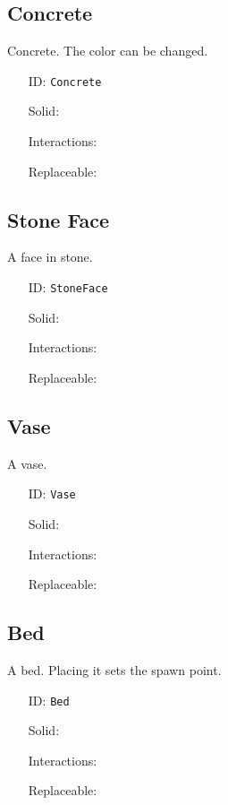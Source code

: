 \subsection{Concrete}\label{subsec:blocks_concrete}
Concrete. The color can be changed.
\newline
\begin{itemize}[nosep]
    \item[ID:] \texttt{Concrete}
    \item[Solid:]  \Checkmark \item[Interactions:]  \Checkmark \item[Replaceable:]  \XSolidBrush
\end{itemize}

\subsection{Stone Face}\label{subsec:blocks_stone face}
A face in stone.
\newline
\begin{itemize}[nosep]
    \item[ID:] \texttt{StoneFace}
    \item[Solid:]  \Checkmark \item[Interactions:]  \XSolidBrush \item[Replaceable:]  \XSolidBrush
\end{itemize}

\subsection{Vase}\label{subsec:blocks_vase}
A vase.
\newline
\begin{itemize}[nosep]
    \item[ID:] \texttt{Vase}
    \item[Solid:]  \Checkmark \item[Interactions:]  \XSolidBrush \item[Replaceable:]  \XSolidBrush
\end{itemize}

\subsection{Bed}\label{subsec:blocks_bed}
A bed. Placing it sets the spawn point.
\newline
\begin{itemize}[nosep]
    \item[ID:] \texttt{Bed}
    \item[Solid:]  \Checkmark \item[Interactions:]  \Checkmark \item[Replaceable:]  \XSolidBrush
\end{itemize}

